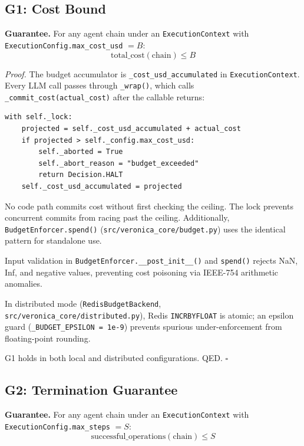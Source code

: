 \documentclass[11pt]{article}
\newenvironment{proof}{\par\noindent\textit{Proof.}\enspace}{\hfill$\square$\par\medskip}
\begin{document}
\subsection{G1: Cost Bound}

\textbf{Guarantee.} For any agent chain under an \texttt{ExecutionContext}
with \texttt{ExecutionConfig.max\_cost\_usd} $= B$:
\[
  \text{total\_cost}(\text{chain}) \leq B
\]

\begin{proof}
The budget accumulator is \texttt{\_cost\_usd\_accumulated} in
\texttt{ExecutionContext}. Every LLM call passes through \texttt{\_wrap()},
which calls \texttt{\_commit\_cost(actual\_cost)} after the callable returns:

\begin{lstlisting}
with self._lock:
    projected = self._cost_usd_accumulated + actual_cost
    if projected > self._config.max_cost_usd:
        self._aborted = True
        self._abort_reason = "budget_exceeded"
        return Decision.HALT
    self._cost_usd_accumulated = projected
\end{lstlisting}

No code path commits cost without first checking the ceiling. The lock
prevents concurrent commits from racing past the ceiling. Additionally,
\texttt{BudgetEnforcer.spend()} (\texttt{src/veronica\_core/budget.py}) uses
the identical pattern for standalone use.

Input validation in \texttt{BudgetEnforcer.\_\_post\_init\_\_()} and
\texttt{spend()} rejects NaN, Inf, and negative values, preventing cost
poisoning via IEEE-754 arithmetic anomalies.

In distributed mode (\texttt{RedisBudgetBackend},
\texttt{src/veronica\_core/distributed.py}), Redis \texttt{INCRBYFLOAT} is
atomic; an epsilon guard (\texttt{\_BUDGET\_EPSILON = 1e-9}) prevents spurious
under-enforcement from floating-point rounding.

G1 holds in both local and distributed configurations. QED.
\end{proof}

\subsection{G2: Termination Guarantee}

\textbf{Guarantee.} For any agent chain under an \texttt{ExecutionContext}
with \texttt{ExecutionConfig.max\_steps} $= S$:
\[
  \text{successful\_operations}(\text{chain}) \leq S
\]
\end{document}
